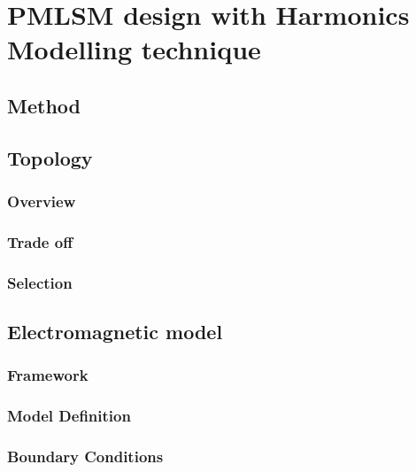 \chapter{PMLSM design with Harmonics Modelling technique}   \label{Chapter:PMLSM design HM}


\section{Method}                                \label{Chapter:PMLSM design HM/method}


\section{Topology}                              \label{Chapter:PMLSM design HM/topology}
    \subsection{Overview}                       \label{Chapter:PMLSM design HM/topology/overview}
    \subsection{Trade off}                      \label{Chapter:PMLSM design HM/topology/trade off}
    \subsection{Selection}                      \label{Chapter:PMLSM design HM/topology/selection}


\section{Electromagnetic model}                 \label{Chapter:PMLSM design HM/electromagnetic model}
    \subsection{Framework}                      \label{Chapter:PMLSM design HM/electromagnetic model/framework}
    \subsection{Model Definition}               \label{Chapter:PMLSM design HM/electromagnetic model/model definition}
    \subsection{Boundary Conditions}            \label{Chapter:PMLSM design HM/electromagnetic model/Boundary conditions}

